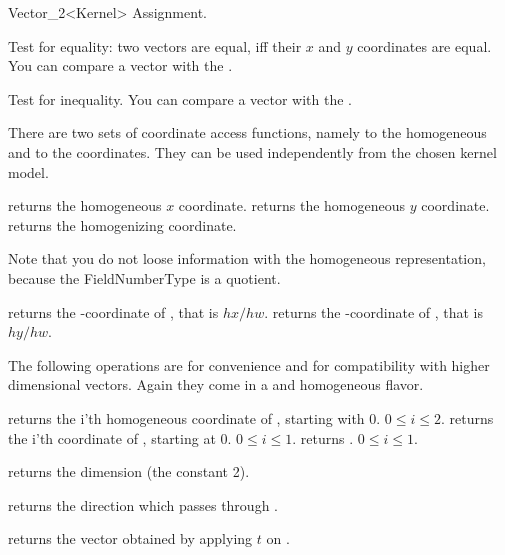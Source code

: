 \begin{ccRefClass} {Vector_2<Kernel>}
\ccHidden {}
        {Assignment.}

       {Test for equality: two vectors are equal, iff their $x$ and $y$ 
        coordinates are equal. You can compare a vector with the
        .}

       {Test for inequality. You can compare a vector with the
        .}

There are two sets of coordinate access functions, namely to the
homogeneous and to the  coordinates. They can be used
independently from the chosen kernel model.

       {returns the homogeneous $x$ coordinate.}
\ccGlue
{}
       {returns the homogeneous $y$ coordinate.}
\ccGlue
{}
       {returns the homogenizing  coordinate.}

Note that you do not loose information with the homogeneous
representation, because the FieldNumberType is a quotient.

       {returns the -coordinate of \ccVar, that is $hx/hw$.}
\ccGlue
{}
       {returns the -coordinate of \ccVar, that is $hy/hw$.}
       
The following operations are for convenience and for compatibility
with higher dimensional vectors.  Again they come in a
 and homogeneous flavor.

       {returns the i'th homogeneous coordinate of \ccVar, starting with 0.
        \ccPrecond $0\leq i \leq 2$.}
\ccGlue
{}
       {returns the i'th  coordinate of \ccVar, starting at 0.
        \ccPrecond $0\leq i \leq 1$.}
\ccGlue
{}
       {returns  .
        \ccPrecond $0\leq i \leq 1$.}

       {returns the dimension (the constant 2).}

       {returns the direction which passes through \ccVar.}

       {returns the vector obtained by applying $t$ on \ccVar.}


\end{ccRefClass}

